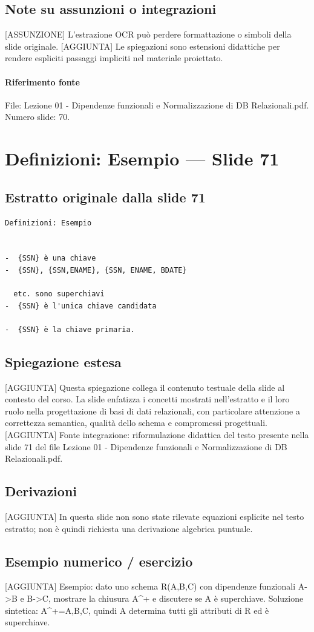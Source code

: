 \documentclass[11pt]{article}
\begin{document}
\subsection*{Note su assunzioni o integrazioni}
[ASSUNZIONE] L'estrazione OCR può perdere formattazione o simboli della slide originale.
[AGGIUNTA] Le spiegazioni sono estensioni didattiche per rendere espliciti passaggi impliciti nel materiale proiettato.
\paragraph{Riferimento fonte} File: Lezione 01 - Dipendenze funzionali e Normalizzazione di DB Relazionali.pdf. Numero slide: 70.
\section{Definizioni: Esempio --- Slide 71}
\subsection*{Estratto originale dalla slide 71}
\begin{lstlisting}
Definizioni: Esempio


-  {SSN} è una chiave
-  {SSN}, {SSN,ENAME}, {SSN, ENAME, BDATE}

  etc. sono superchiavi
-  {SSN} è l'unica chiave candidata

-  {SSN} è la chiave primaria.
\end{lstlisting}
\subsection*{Spiegazione estesa}
[AGGIUNTA] Questa spiegazione collega il contenuto testuale della slide al contesto del corso. La slide enfatizza i concetti mostrati nell'estratto e il loro ruolo nella progettazione di basi di dati relazionali, con particolare attenzione a correttezza semantica, qualità dello schema e compromessi progettuali.
[AGGIUNTA] Fonte integrazione: riformulazione didattica del testo presente nella slide 71 del file Lezione 01 - Dipendenze funzionali e Normalizzazione di DB Relazionali.pdf.
\subsection*{Derivazioni}
[AGGIUNTA] In questa slide non sono state rilevate equazioni esplicite nel testo estratto; non è quindi richiesta una derivazione algebrica puntuale.
\subsection*{Esempio numerico / esercizio}
[AGGIUNTA] Esempio: dato uno schema R(A,B,C) con dipendenze funzionali A->B e B->C, mostrare la chiusura A^+ e discutere se A è superchiave. Soluzione sintetica: A^+={A,B,C}, quindi A determina tutti gli attributi di R ed è superchiave.
\end{document}
